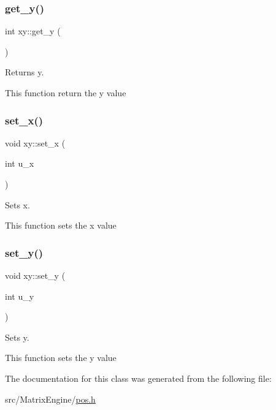 \subsubsection{\texorpdfstring{get\+\_\+y()}{get\_y()}}
{\footnotesize\ttfamily int xy\+::get\+\_\+y (\begin{DoxyParamCaption}{ }\end{DoxyParamCaption})\hspace{0.3cm}{\ttfamily [inline]}}



Returns y. 

This function return the y value \mbox{\label{classxy_a678930bc07affb2959df965ddcf6e453}} 
\subsubsection{\texorpdfstring{set\+\_\+x()}{set\_x()}}
{\footnotesize\ttfamily void xy\+::set\+\_\+x (\begin{DoxyParamCaption}\item[{int}]{u\+\_\+x }\end{DoxyParamCaption})\hspace{0.3cm}{\ttfamily [inline]}}



Sets x. 

This function sets the x value \mbox{\label{classxy_aa45ba61f107343f3eb499f85635bfd99}} 
\subsubsection{\texorpdfstring{set\+\_\+y()}{set\_y()}}
{\footnotesize\ttfamily void xy\+::set\+\_\+y (\begin{DoxyParamCaption}\item[{int}]{u\+\_\+y }\end{DoxyParamCaption})\hspace{0.3cm}{\ttfamily [inline]}}



Sets y. 

This function sets the y value 

The documentation for this class was generated from the following file\+:\begin{DoxyCompactItemize}
\item 
src/\+Matrix\+Engine/\hyperlink{pos_8h}{pos.\+h}\end{DoxyCompactItemize}
